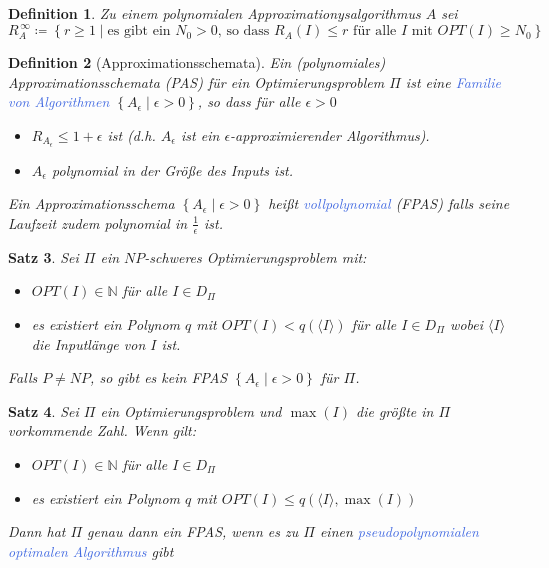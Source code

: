 \documentclass[11pt]{article}
\newcommand{\tcol}[1]{\textcolor{RoyalBlue}{#1}}
\newcommand{\set}[1]{\left\lbrace #1\right\rbrace}
\theoremstyle{break}
\newtheorem{satz}{Satz}[section]
\newtheorem{defi}[satz]{Definition}
\begin{document}
\begin{defi}
Zu einem polynomialen Approximationysalgorithmus $A$ sei
\[R^{\,\infty}_A\coloneqq\set{r\geq 1 \mid\text{es gibt ein $N_0>0$, so dass $R_A(I)\leq r$ für alle $I$ mit $OPT(I)\geq N_0$}}\]
\end{defi}

\begin{defi}[Approximationsschemata]
Ein (polynomiales) Approximationsschemata (PAS) für ein Optimierungsproblem $\Pi$ ist eine \tcol{Familie von Algorithmen} $\set{A_\epsilon\mid\epsilon>0}$, so dass für alle $\epsilon>0$
\begin{itemize}
\item $R_{A_\epsilon}\leq 1+\epsilon$ ist (d.h. $A_\epsilon$ ist ein $\epsilon$-approximierender Algorithmus).
\item $A_\epsilon$ polynomial in der Größe des Inputs ist.
\end{itemize}
Ein Approximationsschema $\set{A_\epsilon\mid\epsilon>0}$ heißt \tcol{vollpolynomial} (FPAS) falls seine Laufzeit zudem polynomial in $\frac{1}{\epsilon}$ ist.
\end{defi}

\begin{satz}
Sei $\Pi$ ein $NP$-schweres Optimierungsproblem mit:
\begin{itemize}
\item $OPT(I)\in\mathbb{N}$ für alle $I\in D_\Pi$
\item es existiert ein Polynom $q$ mit $OPT(I)<q(\langle I\rangle)$ für alle $I\in D_\Pi$ wobei $\langle I\rangle$ die Inputlänge von $I$ ist.
\end{itemize}
Falls $P\neq NP$, so gibt es kein FPAS $\set{A_\epsilon\mid\epsilon>0}$ für $\Pi$.
\end{satz}

\begin{satz}
Sei $\Pi$ ein Optimierungsproblem und $\max(I)$ die größte in $\Pi$ vorkommende Zahl. Wenn gilt:
\begin{itemize}
\item $OPT(I)\in\mathbb{N}$ für alle $I\in D_\Pi$
\item es existiert ein Polynom $q$ mit $OPT(I)\leq q(\langle I\rangle,\max(I))$
\end{itemize}
Dann hat $\Pi$ genau dann ein FPAS, wenn es zu $\Pi$ einen \tcol{pseudopolynomialen optimalen Algorithmus} gibt
\end{satz}
\end{document}
